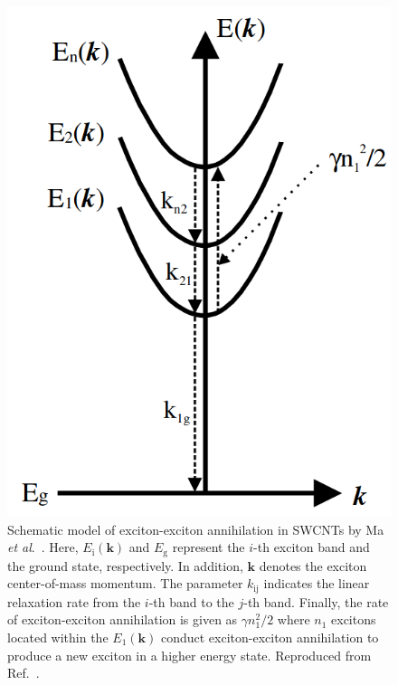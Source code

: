 \begin{figure}[ht]
	\centering
	\includegraphics[scale=0.3]{images/chapter_prior_works/exciton_schematic_ma_2005}
	\caption{Schematic model of exciton-exciton annihilation in SWCNTs by Ma \textit{et al}.\ \cite{ma2005femtosecond}. Here, $E_\text{i}(\mathbf{k})$ and $E_\text{g}$ represent the $i$-th exciton band and the ground state, respectively. In addition, $\mathbf{k}$ denotes the exciton center-of-mass momentum. The parameter $k_\text{ij}$ indicates the linear relaxation rate from the $i$-th band to the $j$-th band. Finally, the rate of exciton-exciton annihilation is given as $\gamma n_1^2/2$ where  $n_1$ excitons located within the $E_1(\mathbf{k})$ conduct exciton-exciton annihilation to produce a new exciton in a higher energy state. Reproduced from Ref.\ \cite{ma2005femtosecond}.}
	\label{fig:exciton_schematic_ma}
\end{figure}

